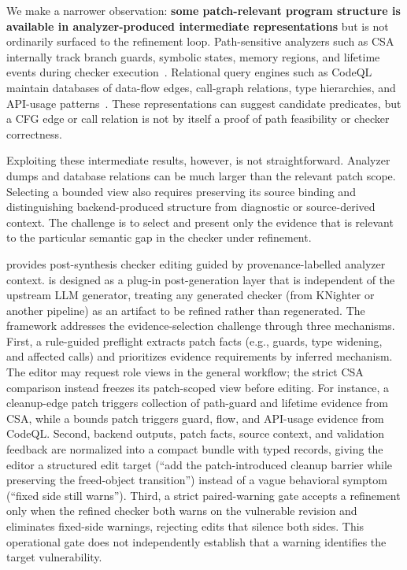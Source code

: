 We make a narrower observation: \textbf{some patch-relevant program structure is available in analyzer-produced intermediate representations} but is not ordinarily surfaced to the refinement loop.
Path-sensitive analyzers such as CSA internally track branch guards, symbolic states, memory regions, and lifetime events during checker execution~\cite{clangsaDocs}.
Relational query engines such as CodeQL maintain databases of data-flow edges, call-graph relations, type hierarchies, and API-usage patterns~\cite{avgustinov2016ql,codeqlDocs}.
These representations can suggest candidate predicates, but a CFG edge or call relation is not by itself a proof of path feasibility or checker correctness.

Exploiting these intermediate results, however, is not straightforward.
Analyzer dumps and database relations can be much larger than the relevant patch scope. Selecting a bounded view also requires preserving its source binding and distinguishing backend-produced structure from diagnostic or source-derived context.
The challenge is to select and present only the evidence that is relevant to the particular semantic gap in the checker under refinement.

\toolname provides post-synthesis checker editing guided by provenance-labelled analyzer context.
\toolname is designed as a plug-in post-generation layer that is independent of the upstream LLM generator, treating any generated checker (from KNighter or another pipeline) as an artifact to be refined rather than regenerated.
The framework addresses the evidence-selection challenge through three mechanisms.
First, a rule-guided preflight extracts patch facts (e.g., guards, type widening, and affected calls) and prioritizes evidence requirements by inferred mechanism.  The editor may request role views in the general workflow; the strict CSA comparison instead freezes its patch-scoped view before editing.
For instance, a cleanup-edge patch triggers collection of path-guard and lifetime evidence from CSA, while a bounds patch triggers guard, flow, and API-usage evidence from CodeQL.
Second, backend outputs, patch facts, source context, and validation feedback are normalized into a compact bundle with typed records, giving the editor a structured edit target (``add the patch-introduced cleanup barrier while preserving the freed-object transition'') instead of a vague behavioral symptom (``fixed side still warns'').
Third, a strict paired-warning gate accepts a refinement only when the refined checker both warns on the vulnerable revision and eliminates fixed-side warnings, rejecting edits that silence both sides. This operational gate does not independently establish that a warning identifies the target vulnerability.

